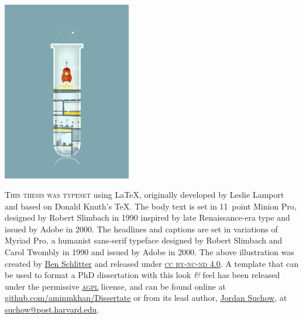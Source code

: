 \newpage
\thispagestyle{empty}
	
  \vspace{10pt}
  \centering
  \includegraphics[width=0.42\textwidth]{endmatter/colophon.png}

\vspace{20pt}

\begin{center}
\parbox{220pt}{\small \lettrine[lines=3,slope=-2pt,nindent=-4pt]{\textcolor{SchoolColor}{T}}{his thesis was typeset} 
using \LaTeX, originally developed by Leslie Lamport and based on Donald Knuth's \TeX. 
The body text is set in 11~point Minion Pro, designed by Robert Slimbach in 1990 inspired by late Renaissance-era type and issued by Adobe in 2000.
The headlines and captions are set in variations of Myriad Pro, a humanist sans-serif typeface designed by Robert Slimbach and Carol Twombly in 1990 and issued by Adobe in 2000.
The above illustration %
was created by \href{http://www.studiobenben.com/27771/428167/projects/science-experiments}{Ben Schlitter} 
and released under \href{http://creativecommons.org/licenses/by-nc-nd/4.0/}{\textsc{cc by-nc-nd 4.0}}. 
A template that can be used to format a PhD dissertation with this look \textit{\&} feel has been released under the permissive \href{http://www.gnu.org/licenses/agpl-3.0.html}{\textsc{agpl}} license, and can be found online at \href{https://github.com/aminmkhan/Dissertate}{github.com/aminmkhan/Dissertate}
or from its lead author, \href{https://github.com/suchow}{Jordan Suchow}, at \href{mailto:suchow@post.harvard.edu}{suchow@post.harvard.edu}.}
\end{center}
